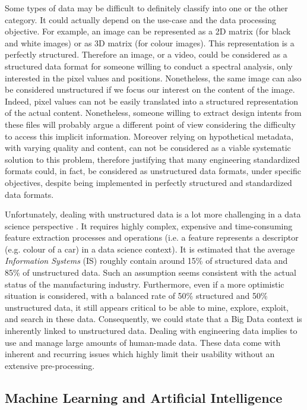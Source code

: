 Some types of data may be difficult to definitely classify into one or the other category. It could actually depend on the use-case and the data processing objective. For example, an image can be represented as a 2D matrix (for black and white images) or as 3D matrix (for colour images). This representation is a perfectly structured. Therefore an image, or a video, could be considered as a structured data format for someone willing to conduct a spectral analysis, only interested in the pixel values and positions. Nonetheless, the same image can also be considered unstructured if we focus our interest on the content of the image. Indeed, pixel values can not be easily translated into a structured representation of the actual content.
Nonetheless, someone willing to extract design intents from these files will probably argue a different point of view considering the difficulty to access this implicit information. Moreover relying on hypothetical metadata, with varying quality and content, can not be considered as a viable systematic solution to this problem, therefore justifying that many engineering standardized formats could, in fact, be considered as unstructured data formats, under specific objectives, despite being implemented in perfectly structured and standardized data formats.

Unfortunately, dealing with unstructured data is a lot more challenging in a data science perspective \citep{blumberg2003problem}\citep{sagiroglu2013big} \citep{buneman1997adding}. It requires highly complex, expensive and time-consuming feature extraction processes and operations (i.e. a feature represents a descriptor (e.g. colour of a car) in a data science context). It is estimated that the average \textit{Information Systems} (IS) roughly contain around 15\% of structured data and 85\% of unstructured data. Such an assumption seems consistent with the actual status of the manufacturing industry. Furthermore, even if a more optimistic situation is considered, with a balanced rate of 50\% structured and 50\% unstructured data, it still appears critical to be able to mine, explore, exploit, and search in these data. Consequently, we could state that a Big Data context is inherently linked to unstructured data.
Dealing with engineering data implies to use and manage large amounts of human-made data. These data come with inherent and recurring issues which highly limit their usability without an extensive pre-processing.


\subsection{Machine Learning and Artificial Intelligence}

